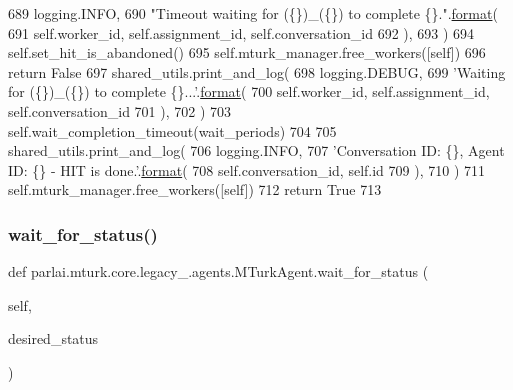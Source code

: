 \begin{DoxyCode}
689                         logging.INFO,
690                         \textcolor{stringliteral}{"Timeout waiting for (\{\})\_(\{\}) to complete \{\}."}.\hyperlink{namespaceparlai_1_1chat__service_1_1services_1_1messenger_1_1shared__utils_a32e2e2022b824fbaf80c747160b52a76}{format}(
691                             self.worker\_id, self.assignment\_id, self.conversation\_id
692                         ),
693                     )
694                     self.set\_hit\_is\_abandoned()
695                     self.mturk\_manager.free\_workers([self])
696                     \textcolor{keywordflow}{return} \textcolor{keyword}{False}
697             shared\_utils.print\_and\_log(
698                 logging.DEBUG,
699                 \textcolor{stringliteral}{'Waiting for (\{\})\_(\{\}) to complete \{\}...'}.\hyperlink{namespaceparlai_1_1chat__service_1_1services_1_1messenger_1_1shared__utils_a32e2e2022b824fbaf80c747160b52a76}{format}(
700                     self.worker\_id, self.assignment\_id, self.conversation\_id
701                 ),
702             )
703             self.wait\_completion\_timeout(wait\_periods)
704 
705         shared\_utils.print\_and\_log(
706             logging.INFO,
707             \textcolor{stringliteral}{'Conversation ID: \{\}, Agent ID: \{\} - HIT is done.'}.\hyperlink{namespaceparlai_1_1chat__service_1_1services_1_1messenger_1_1shared__utils_a32e2e2022b824fbaf80c747160b52a76}{format}(
708                 self.conversation\_id, self.id
709             ),
710         )
711         self.mturk\_manager.free\_workers([self])
712         \textcolor{keywordflow}{return} \textcolor{keyword}{True}
713 
\end{DoxyCode}
\mbox{\label{classparlai_1_1mturk_1_1core_1_1legacy__2018_1_1agents_1_1MTurkAgent_a523bffdcd46a437e641b94f5700c0e16}} 
\subsubsection{\texorpdfstring{wait\+\_\+for\+\_\+status()}{wait\_for\_status()}}
{\footnotesize\ttfamily def parlai.\+mturk.\+core.\+legacy\+\_.\+agents.\+M\+Turk\+Agent.\+wait\+\_\+for\+\_\+status (\begin{DoxyParamCaption}\item[{}]{self,  }\item[{}]{desired\+\_\+status }\end{DoxyParamCaption})}

